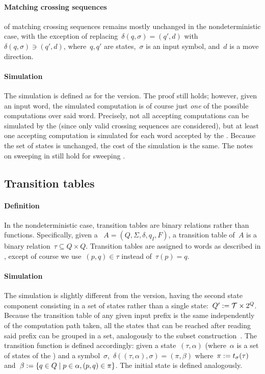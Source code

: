 \paragraph{Matching crossing sequences}  of matching crossing sequences remains mostly unchanged in the nondeterministic case, with the exception of replacing~$\delta(q,\sigma)=(q',d)$ with~$\delta(q,\sigma)\ni(q',d)$, where~$q,q'$ are states,~$\sigma$ is an input symbol, and~$d$ is a move direction.

\paragraph{Simulation} The simulation is defined as for the \TDFA version.
The proof still holds; however, given an input word, the simulated computation is of course just \emph{one} of the possible computations over said word.
Precisely, not all accepting computations can be simulated by the \ONFA (since only valid crossing sequences are considered), but at least one accepting computation is simulated for each word accepted by the \TNFA.
Because the set of states is unchanged, the cost of the simulation is the same.
The notes on sweeping \TDFAs in  still hold for sweeping \TNFAs.


\subsection{Transition tables}

\paragraph{Definition} In the nondeterministic case, transition tables are binary relations rather than functions.
Specifically, given a \TNFA~$A=(Q,\Sigma,\delta,q_I,F)$, a transition table of~$A$ is a binary relation~$\tau\subseteq Q\times Q$.
Transition tables are assigned to words as described in , except of course we use~$(p,q)\in\tau$ instead of~$\tau(p)=q$.

\paragraph{Simulation} The simulation is slightly different from the \TDFA version, having the second state component consisting in a set of states rather than a single state:~$Q':=\mathcal T\times2^{Q}$.
Because the transition table of any given input prefix is the same independently of the computation path taken, all the states that can be reached after reading said prefix can be grouped in a set, analogously to the subset construction~\cite{RabSco59,HopUll79}.
The transition function is defined accordingly: given a state~$(\tau,\alpha)$ (where~$\alpha$ is a set of states of the \TNFA) and a symbol~$\sigma$,~$\delta((\tau,\alpha),\sigma)=(\pi,\beta)$ where~$\pi:=t_\sigma(\tau)$ and~$\beta:=\{q\in Q\mid p\in\alpha, (p,q)\in\pi\}$.
The initial state is defined analogously.

